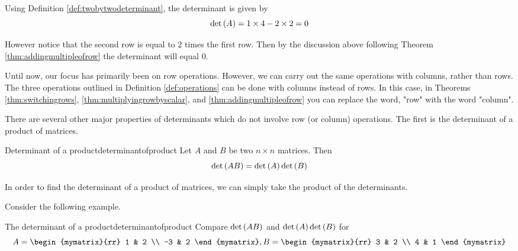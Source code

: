 \begin{solution}
Using Definition \ref{def:twobytwodeterminant}, the determinant is given by
\[
\det \left(A \right) = 1 \times 4 - 2 \times 2 = 0
\]

However notice that the second row is equal to $2$ times the first row. Then by the discussion above following Theorem \ref{thm:addingmultipleofrow} the determinant will equal $0$.
\end{solution}

Until now, our focus has primarily been on row operations. However, we can carry out the 
same operations with columns, rather than rows. The three operations outlined in
Definition \ref{def:operations} can be done with columns instead of rows. 
In this case, in Theorems \ref{thm:switchingrows}, \ref{thm:multiplyingrowbyscalar}, 
and \ref{thm:addingmultipleofrow} you can replace
the word, "row" with the word "column".

There are several other major properties of determinants which do not involve
row (or column) operations. The first is the determinant of a product of matrices. 

\begin{theorem}{Determinant of a product}{determinantofproduct}
Let $A$ and $B$ be two $n\times n$ matrices. Then
\begin{equation*}
\det \left(AB\right) =\det \left(A\right) \det \left(B\right)
\end{equation*}
\end{theorem}

In order to find the determinant of a product of matrices, we can simply take the product of the determinants. 

Consider the following example.

\begin{example}{The determinant of a product}{determinantofproduct}
Compare $\det \left(AB\right) $ and $\det \left(A\right) \det \left(
B\right) $ for
\begin{equation*}
A=\begin{mymatrix}{rr}
1 & 2 \\
-3 & 2
\end{mymatrix} ,B=\begin{mymatrix}{rr}
3 & 2 \\
4 & 1
\end{mymatrix} 
\end{equation*}
\end{example}

